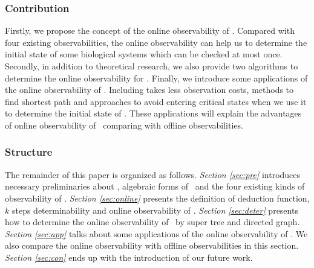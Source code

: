 \subsubsection*{Contribution}
Firstly, we propose the concept of the online observability of \BCNs. Compared with four existing observabilities, the online observability can help us to determine the initial state of some biological systems which can be checked at most once. Secondly, in addition to theoretical research, we also provide two algorithms to determine the online observability for \BCNs. Finally, we introduce some applications of the online observability of \BCNs. Including takes less observation costs, methods to find shortest path and approaches to avoid entering critical states when we use it to determine the initial state of \BCNs.  These applications will explain the advantages of online observability of \BCNs\ comparing with offline observabilities. %
\subsubsection*{Structure}
The remainder of this paper is organized as follows. {\em Section \ref{sec:pre}} introduces necessary preliminaries about \BCNs, algebraic forms of \BCNs\ and the four existing kinds of observability of  \BCNs. {\em Section \ref{sec:online}} presents the definition of deduction function, $k$ steps determinability and online observability of \BCNs. {\em Section \ref{sec:deter}} presents how to determine the online observability of \BCNs\ by super tree and directed graph. {\em Section \ref{sec:app}} talks about some applications of the online observability of \BCNs. We also compare the online observability with offline observabilities in this section. {\em Section \ref{sec:con}} ends up  with the introduction of our future work.


